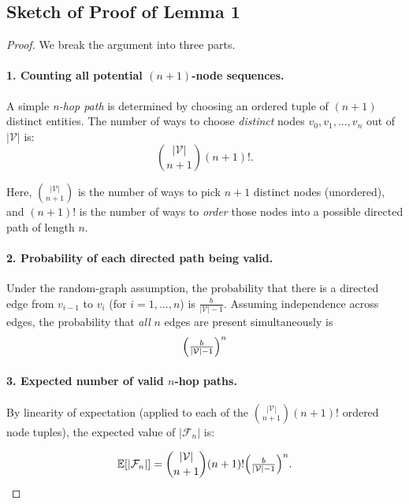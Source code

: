     \subsection{Sketch of Proof of Lemma 1} \label{sec:proof_lemma1}
        \begin{proof}[Proof]
            We break the argument into three parts.
            \paragraph{1. Counting all potential $(n+1)$-node sequences.}

                A simple \emph{n-hop path} is determined by choosing an ordered tuple of $(n+1)$ distinct entities. The number of ways to choose \emph{distinct} nodes $v_0,v_1,...,v_n$ out of $|\mathcal{V}|$ is:
                \[
                \binom{|\mathcal{V}|}{n+1} (n+1)!.
                \]
                
                Here, $\binom{|\mathcal{V}|}{n+1}$ is the number of ways to pick $n+1$ distinct nodes (unordered), and $(n+1)!$ is the number of ways to \emph{order} those nodes into a possible directed path of length $n$.

            \paragraph{2. Probability of each directed path being valid.}

                Under the random-graph assumption, the probability that there is a directed edge from $v_{i-1}$ to $v_i$ (for $i=1,...,n$) is $\frac{b}{|\mathcal{V}|-1}$.
                Assuming independence across edges, the probability that \emph{all} $n$ edges are present simultaneously is
                \[
                \Bigl(\tfrac{b}{|\mathcal{V}|-1}\Bigr)^{n}
                \]

            \paragraph{3. Expected number of valid $n$-hop paths.}

                By linearity of expectation (applied to each of the $\binom{|\mathcal{V}|}{n+1} (n+1)!$ ordered node tuples), the expected value of $|\mathcal{F}_n|$ is:

                \[ 
                \mathbb{E}[|\mathcal{F}_n|] = \binom{|\mathcal{V}|}{n+1} (n+1)! \Bigl(\tfrac{b}{|\mathcal{V}|-1}\Bigr)^{n}.
                \]


\end{proof}
